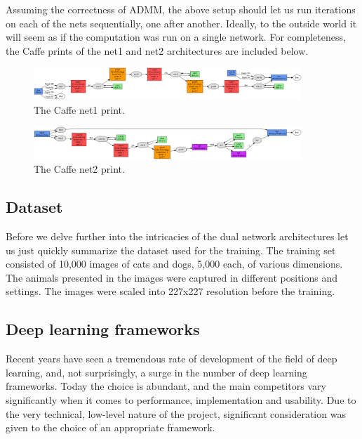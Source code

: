 \documentclass[a4paper, 11pt]{article}
\numberwithin{equation}{section}
\begin{document}
	Assuming the correctness of ADMM, the above setup should let us run iterations on each of the nets sequentially, one after another. Ideally, to the outside world it will seem as if the computation was run on a single network. For completeness, the Caffe prints of the net1 and net2 architectures are included below.
	
	\begin{figure}[!h]
		\centering
		\includegraphics[page=1,width=0.9\textwidth]{net1.png}
		\caption{\label{fig:net1}{The Caffe net1 print.}}
	\end{figure}
	
	\begin{figure}[!h]
		\centering
		\includegraphics[page=1,width=0.9\textwidth]{net2.png}
		\caption{\label{fig:net1}{The Caffe net2 print.}}
	\end{figure}
	
	\subsection{Dataset}
	
	Before we delve further into the intricacies of the dual network architectures let us just quickly summarize the dataset used for the training. The training set consisted of 10,000 images of cats and dogs, 5,000 each, of various dimensions. The animals presented in the images were captured in different positions and settings. The images were scaled into 227x227 resolution before the training.
	
	\subsection{Deep learning frameworks}
	Recent years have seen a tremendous rate of development of the field of deep learning, and, not surprisingly, a surge in the number of deep learning frameworks. Today the choice is abundant, and the main competitors vary significantly when it comes to performance, implementation and usability. Due to the very technical, low-level nature of the project, significant consideration was given to the choice of an appropriate framework.
	
\end{document}
